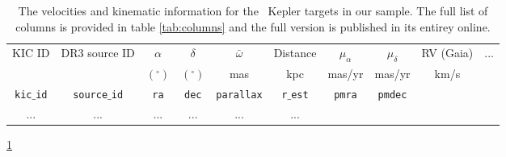 \begin{table}[h!]
  \begin{center}
      \caption{
The velocities and kinematic information for the \nstars\ Kepler targets in
      our sample.
      The full list of columns is provided in table \ref{tab:columns} and the
      full version is published in its entirey online.
      }
\label{tab:data}
\begin{tabular}{cccccccccc}
    KIC ID & DR3 source ID & $\alpha$ & $\delta$ & $\bar{\omega}$
    & Distance & $\mu_{\alpha}$ & $\mu_\delta$ & RV (Gaia) & ... \\
    & & $(^\circ)$ & $(^\circ)$ & mas & kpc & mas/yr & mas/yr & km/s & \\
    {\tt kic$\_$id} & {\tt source$\_$id} & {\tt ra} & {\tt dec} &
    {\tt parallax} & {\tt r$\_$est} & {\tt pmra} & {\tt pmdec} \\
\hline
... & ... & ... & ... & ... & ... \\
\end{tabular}
\end{center}
\ref{tab:data}
\end{table}

